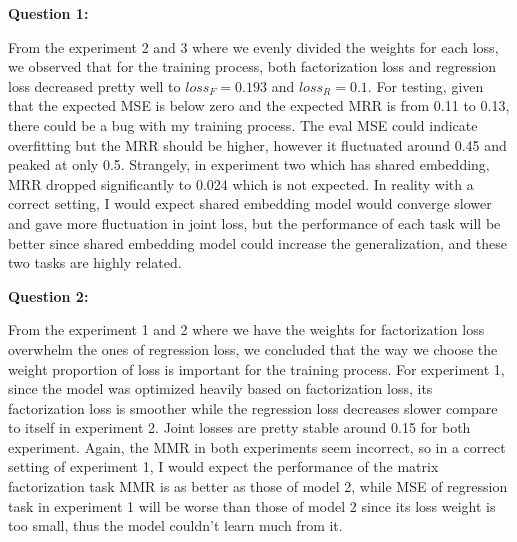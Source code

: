 \documentclass[]{article}
\begin{document}
	\textbf{Question 1:} \par
	From the experiment 2 and 3 where we evenly divided the weights for each loss, we observed that for the training process, both factorization loss and regression loss decreased pretty well to $loss_{F} = 0.193$ and $loss_{R} = 0.1$.
	For testing, given that the expected MSE is below zero and the expected MRR is from 0.11 to 0.13, there could be a bug with my training process. The eval MSE could indicate overfitting but the MRR should be higher, however it fluctuated around 0.45 and peaked at only 0.5. Strangely, in experiment two which has shared embedding, MRR dropped significantly to 0.024 which is not expected. In reality with a correct setting, I would expect shared embedding model would converge slower and gave more fluctuation in joint loss, but the performance of each task will be better since shared embedding model could increase the generalization, and these two tasks are highly related. \par
	\textbf{Question 2:} \par
	From the experiment 1 and 2 where we have the weights for factorization loss overwhelm the ones of regression loss, we concluded that the way we choose the weight proportion of loss is important for the training process. For experiment 1, since the model was optimized heavily based on factorization loss, its factorization loss is smoother while the regression loss decreases slower compare to itself in experiment 2. Joint losses are pretty stable around 0.15 for both experiment. Again, the MMR in both experiments seem incorrect, so in a correct setting of experiment 1, I would expect the performance of the matrix factorization task MMR is as better as those of model 2, while MSE of regression task in experiment 1 will be worse than those of model 2 since its loss weight is too small, thus the model couldn't learn much from it. 
	
\end{document}
